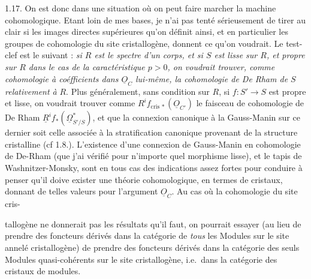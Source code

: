 \documentclass[11pt,a4paper]{article}
\begin{document}
1.17. On est donc dans une situation où on peut faire marcher la machine
cohomologique. Etant loin de mes bases, je n'ai pas tenté sérieusement de
tirer au clair si les images directes supérieures qu'on définit ainsi, et en
particulier les groupes de cohomologie du site cristallogène, donnent ce qu'on
voudrait. Le test-clef est le suivant : \emph{si $R$ est le spectre d'un corps,
et si $S$ est lisse sur $R$, et propre sur $R$ dans le cas de la
caractéristique $p>0$, on voudrait trouver, comme cohomologie à coéfficients
dans $\underline{O}_C$ lui-même, la cohomologie de De Rham de $S$
relativement à} $R$. Plus généralement, sans condition sur $R$, si
$f\colon S'\to S$ est propre et lisse, on voudrait trouver comme
 $R^if_{\mathrm{cris}\,*}(\underline{O}_{C'})$
 le faisceau de cohomologie de De Rham
$\underline{R}^if_*(\underline{\Omega}^*_{S'/S})$, \struck{\ill{}} et
 que la connexion canonique à la Gauss-Manin sur ce dernier
soit celle associée à la stratification canonique provenant de la structure
cristalline (cf 1.8.). L'existence d'une connexion de Gauss-Manin en cohomologie de
De-Rham (que j'ai vérifié pour n'importe quel morphisme lisse), et le tapis
de Washnitzer-Monsky, sont en tous cas des indications assez fortes pour
conduire à penser qu'il doive exister une théorie cohomologique, en termes de
cristaux, donnant de telles valeurs pour l'argument $\underline{O}_C$. Au
cas où la cohomologie du site cris-

tallogène ne donnerait pas les résultats qu'il faut, on pourrait essayer (au
lieu de prendre des foncteurs dérivés dans la catégorie de \emph{tous} les
Modules sur le site annelé cristallogène) de prendre des foncteurs dérivés dans
la catégorie des seuls Modules quasi-cohérents sur le site cristallogène, i.e.\
dans la catégorie des cristaux de modules.
\end{document}
